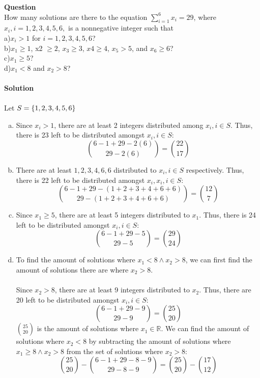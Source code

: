 \documentclass[article, 11pt]{article}
\newcounter{question}
\def\questionnum{{\Large\bfseries{Question \arabic{question} }}\\[1em]}
\newcommand{\question}{
    \stepcounter{question}
    \questionnum
}
\newcommand{\solution}{
    {{\large\bfseries{Solution}}}
}
\DeclarePairedDelimiter\set{\{}{\}}
\newcommand{\reals}{\mathbb{R}} %
\begin{document}
\newpage
\question
How many solutions are there to the equation $\sum_{i=1}^6 x_i=29$, where $x_i, i = 1, 2, 3, 4, 5, 6,$ is a nonnegative integer such that\\ a)$x_i > 1$ for $i = 1, 2, 3, 4, 5, 6$?\\ b)$x_1 \geq 1$, x2 $\geq 2$, $x_3 \geq 3$, $x4 \geq 4$, $x_5 > 5$, and $x_6 \geq 6$?\\ c)$x_1 \geq 5$? \\ d)$x_1 < 8$ and $x_2 > 8$? \\
\\
\solution \\
\\
Let $S=\set*{1,2,3,4,5,6}$
\begin{enumerate}[a)]
    \item 
    Since $x_i > 1$, there are at least 2 integers distributed among $x_i, i \in S$. Thus, there is 23 left to be distributed amongst $x_i, i \in S$:
    \[ \binom{6-1+29-2(6)}{29-2(6)} = \binom{22}{17} \]
    \item 
    There are at least $1,2,3,4,6,6$ distributed to $x_i, i \in S$ respectively. Thus, there is 22 left to be distributed amongst $x_i, x_i, i \in S$:
    \[ \binom{6-1+29-(1+2+3+4+6+6)}{29-(1+2+3+4+6+6)} = \binom{12}{7} \]
    \item
    Since $x_1 \geq 5$, there are at least 5 integers distributed to $x_1$. Thus, there is 24 left to be distributed amongst $x_i, i \in S$: 
    \[ \binom{6-1+29-5}{29-5} = \binom{29}{24} \]    
    \item 
    To find the amount of solutions where $x_1 < 8 \land x_2 > 8$, we can first find the amount of solutions there are where $x_2 > 8$. \\
    \\
    Since $x_2 > 8$, there are at least 9 integers distributed to $x_2$. Thus, there are 20 left to be distributed amongst $x_i, i \in S$:
    \[ \binom{6-1+29-9}{29-9} = \binom{25}{20} \]
    $\displaystyle\binom{25}{20}$ is the amount of solutions where $x_1 \in \reals$. We can find the amount of solutions where $x_2 < 8$ by subtracting the amount of solutions where $x_1 \geq 8 \land x_2 > 8$ from the set of solutions where $x_2 > 8$:
    \[ \binom{25}{20} - \binom{6 - 1 + 29 - 8 - 9}{29 - 8 - 9} = \binom{25}{20} - \binom{17}{12} \]
\end{enumerate}
\end{document}
